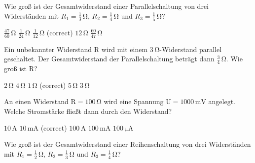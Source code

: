 \documentclass[11pt]{exam}
\begin{document}
\setlength{\voffset}{-0.5in}
\setlength{\headsep}{5pt}

\hspace{2mm}
 \hspace{5mm}
\vspace{4mm}

\begin{questions}

\question Wie groß ist der Gesamtwiderstand einer Parallelschaltung von drei Widerständen mit \(R_1=\mathrm{\frac{1}{3}\,\Omega}\), \(R_2=\mathrm{\frac{1}{4}\,\Omega}\) und \(R_3=\mathrm{\frac{1}{5}\,\Omega}\)?

\begin{choices}
	\choice \(\mathrm{\frac{47}{60}\,\Omega}\)
	\choice \(\mathrm{\frac{1}{24}\,\Omega}\)
	\choice \(\mathrm{\frac{1}{12}\,\Omega}\) (correct)
	\choice \(\mathrm{12\,\Omega}\)
	\choice \(\mathrm{\frac{60}{47}\,\Omega}\)
\end{choices}

\vspace{3mm}\question Ein unbekannter Widerstand \(\mathrm{R}\) wird mit einem \(\mathrm{3\,\Omega}\)-Widerstand parallel geschaltet. Der Gesamtwiderstand der Parallelschaltung beträgt dann \(\mathrm{\frac{3}{4}\,\Omega}\). Wie groß ist \(\mathrm{R}\)?

\begin{choices}
	\choice \(\mathrm{2\,\Omega}\)
	\choice \(\mathrm{4\,\Omega}\)
	\choice \(\mathrm{1\,\Omega}\) (correct)
	\choice \(\mathrm{5\,\Omega}\)
	\choice \(\mathrm{3\,\Omega}\)
\end{choices}

\vspace{3mm}\question An einen Widerstand \(\mathrm{R=100\,\Omega}\) wird eine Spannung \(\mathrm{U=1000\,mV}\) angelegt. Welche Stromstärke fließt dann durch den Widerstand?

\begin{choices}
	\choice \(\mathrm{10\,A}\)
	\choice \(\mathrm{10\,mA}\) (correct)
	\choice \(\mathrm{100\,A}\)
	\choice \(\mathrm{100\,mA}\)
	\choice \(\mathrm{100\,\mu A}\)
\end{choices}

\vspace{3mm}\question Wie groß ist der Gesamtwiderstand einer Reihenschaltung von drei Widerständen mit \(R_1=\mathrm{\frac{1}{2}\,\Omega}\), \(R_2=\mathrm{\frac{1}{3}\,\Omega}\) und \(R_3=\mathrm{\frac{1}{4}\,\Omega}\)?


\end{questions}
\end{document}
